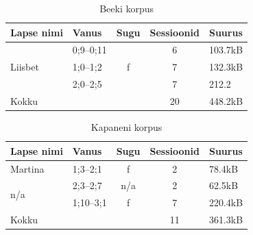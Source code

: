 \documentclass[12pt]{article}
\begin{document}
\begin{table}[H]
\centering
\caption{Beeki korpus}
\begin{tabular}{|l|l|c|c|l|}
\hline
Lapse nimi               & Vanus      & \multicolumn{1}{l|}{Sugu} & \multicolumn{1}{l|}{Sessioonid} & Suurus \\ \hline\hline
\multirow{3}{*}{Liisbet} & 0;9--0;11 & \multirow{3}{*}{f}        & 6                               & 103.7kB  \\ \cline{2-2} \cline{4-5} 
                         & 1;0--1;2   &                           & 7                               & 132.3kB  \\ \cline{2-2} \cline{4-5} 
                         & 2;0--2;5   &                           & 7                               & 212.2  \\ \hline
Kokku                    & \multicolumn{2}{l|}{}                  & 20                              & 448.2kB  \\ \hline
\end{tabular}
\end{table}


\begin{table}[H]
\centering
\caption{Kapaneni korpus}
\begin{tabular}{|l|l|c|c|l|}
\hline
Lapse nimi           & Vanus     & \multicolumn{1}{l|}{Sugu} & \multicolumn{1}{l|}{Sessioonid} & Suurus \\ \hline\hline
Martina              & 1;3--2;1  & f                         & 2                               & 78.4kB   \\ \hline
\multirow{2}{*}{n/a} & 2;3--2;7  & n/a                       & 2                               & 62.5kB   \\ \cline{2-5} 
                     & 1;10--3;1 & f                         & 7                               & 220.4kB  \\ \hline
Kokku                & \multicolumn{2}{l|}{}                 & 11                              & 361.3kB  \\ \hline
\end{tabular}
\end{table}
\hfill
\end{document}
